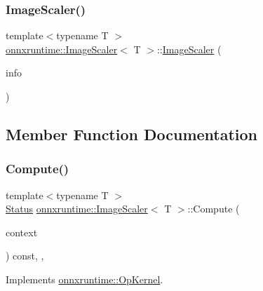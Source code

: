 \subsubsection{\texorpdfstring{Image\+Scaler()}{ImageScaler()}}
{\footnotesize\ttfamily template$<$typename T $>$ \\
\mbox{\hyperlink{classonnxruntime_1_1ImageScaler}{onnxruntime\+::\+Image\+Scaler}}$<$ T $>$\+::\mbox{\hyperlink{classonnxruntime_1_1ImageScaler}{Image\+Scaler}} (\begin{DoxyParamCaption}\item[{const \mbox{\hyperlink{classonnxruntime_1_1OpKernelInfo}{Op\+Kernel\+Info}} \&}]{info }\end{DoxyParamCaption})\hspace{0.3cm}{\ttfamily [inline]}}



\subsection{Member Function Documentation}
\mbox{\label{classonnxruntime_1_1ImageScaler_ab6b04f35b90a54f27093b7915fe3f2a1}} 
\subsubsection{\texorpdfstring{Compute()}{Compute()}}
{\footnotesize\ttfamily template$<$typename T $>$ \\
\mbox{\hyperlink{classonnxruntime_1_1common_1_1Status}{Status}} \mbox{\hyperlink{classonnxruntime_1_1ImageScaler}{onnxruntime\+::\+Image\+Scaler}}$<$ T $>$\+::Compute (\begin{DoxyParamCaption}\item[{\mbox{\hyperlink{classonnxruntime_1_1OpKernelContext}{Op\+Kernel\+Context}} $\ast$}]{context }\end{DoxyParamCaption}) const\hspace{0.3cm}{\ttfamily [inline]}, {\ttfamily [override]}, {\ttfamily [virtual]}}



Implements \mbox{\hyperlink{classonnxruntime_1_1OpKernel_a9eca8656a78b1b3ab9d3351a12798650}{onnxruntime\+::\+Op\+Kernel}}.



